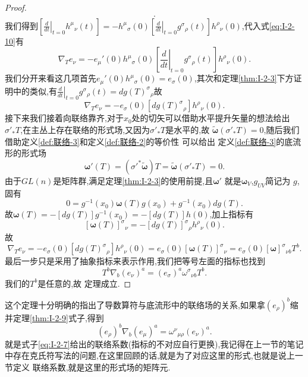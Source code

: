 \documentclass[../main.tex]{subfiles}
\begin{document}
\begin{proof}
\begin{align*}
.\end{align*}
我们得到$ [\left. \frac{d}{dt} \right|_{t = 0} h^{\mu}{}_{\nu}(t)] =- h^{\mu}{}_{\sigma}(0)[ \left. \frac{d}{dt} \right|_{t = 0} g^{\sigma}{}_{\rho}(t)]h^{\rho}{}_{\nu}(0) $,代入式\ref{eq:I-2-10}有\[
    \nabla_T e_\nu  = -e_\mu'(0)  h^{\mu}{}_{\sigma}(0)[ \left. \frac{d}{dt} \right|_{t = 0} g^{\sigma}{}_{\rho}(t)]h^{\rho}{}_{\nu}(0) 
.\] 
我们分开来看这几项首先$e_\mu'(0)  h^{\mu}{}_{\sigma}(0) = e_\sigma(0)$,其次和定理\ref{thm:I-2-3}下方证明中的类似,有$ \left. \frac{d}{dt} \right|_{t = 0} g^{\sigma}{}_{\rho}(t) = dg(T)^{\sigma}{}_{\rho}$故\[
    \nabla_T e_\nu=- e_\sigma(0)[dg(T)^{\sigma}{}_{\rho}]h^{\rho}{}_{\nu}(0)
.\] 
接下来我们接着向联络靠齐,对于$x_0$处的切矢可以借助水平提升矢量的想法给出$\sigma'_*T$,在主丛上存在联络的形式场,又因为$\sigma'_*T$是水平的,故 $\bm{\tilde{\omega}}(\sigma'_* T) = 0$,随后我们借助定义\ref{def:联络-3}和定义\ref{def:联络-2}的等价性
可以给出 定义\ref{def:联络-3}的底流形的形式场 \[\bm{\omega}'(T) = (\sigma'^*\bm{\tilde{\omega}})T = \bm{\tilde{\omega}}(\sigma'_*T) = 0   .\]
由于$GL(n)$是矩阵群,满足定理\ref{thm:I-2-3}的使用前提,且$\bm{\omega}' $ 就是$\bm{\omega}_V$,$g_{UV}$简记为 $g$,固有 \[
0 = g^{-1}(x_0)\bm{\omega}(T)g(x_0) + g^{-1}(x_0)dg(T) 
.\] 
故$\bm{\omega}(T) = -[dg(T)]g^{-1}(x_0) = -[dg(T)]h(0)$,加上指标有\[
  [\bm{\omega}(T)] ^{\sigma}{}_{\nu} = - [dg(T)]^{\sigma}{}_{\rho}h^{\rho}{}_{\nu}(0)
.\] 
故 \[
  \nabla_T e_\nu=- e_\sigma(0)[dg(T)^{\sigma}{}_{\rho}]h^{\rho}{}_{\nu}(0) =e_\sigma(0)[\bm{\omega}(T)] ^{\sigma}{}_{\nu} = e_\sigma(0)[\bm{\omega}] ^{\sigma}{}_{\nu b} T^b
.\] 
最后一步只是采用了抽象指标来表示作用,我们把等号左面的指标也找到\[
  T^b \nabla_b(e_\nu)^a = (e_\sigma)^a\omega^{\sigma}{}_{\nu b}T^b
.\] 
我们的$T^b$是任意的,故 定理成立.
\end{proof}
这个定理十分明确的指出了导数算符与底流形中的联络场的关系,如果拿$(e_\rho)^b$缩并定理\ref{thm:I-2-9}式子,得到
\begin{equation}
  (e_\rho)^b\nabla_b (e_\mu)^a = \omega^{\nu}{}_{\mu \rho}(e_\nu)^a
  . 
  \label{eq:I-2-11}
\end{equation}
就是式子\ref{eq:I-2-7}给出的联络系数(指标的不对应自行更换),我记得在上一节的笔记中存在克氏符写法的问题,在这里回顾的话,就是为了对应这里的形式,也就是说上一节定义
联络系数,就是这里的形式场的矩阵元.
\end{document}
